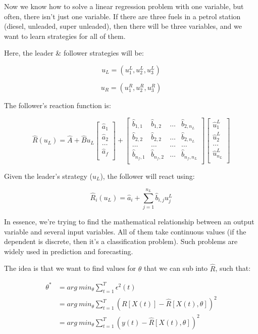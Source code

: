 Now we know how to solve a linear regression problem with one variable, but
often, there isn't just one variable. If there are three fuels in a petrol
station (diesel, unleaded, super unleaded), then there will be three variables,
and we want to learn strategies for all of them.

Here, the leader \& follower strategies will be:

\[
  u_L = (u^L_1, u^L_2, u^L_3)
\]

\[
  u_R = (u^R_1, u^R_2, u^R_3)
\]

The follower's reaction function is:

\[
\hat{R}(u_L) = \hat{A} + \hat{B} u_L
  \begin{bmatrix}
    \hat{a}_1\\
    \hat{a}_2\\
    \dots\\
    \hat{a}_f\\
  \end{bmatrix}
  +
  \begin{bmatrix}
    \hat{b}_{1,1}& \hat{b}_{1,2} & \dots & \hat{b}_{2,n_L}\\
    \hat{b}_{2,2}& \hat{b}_{2,2} & \dots & \hat{b}_{2,n_L}\\
    \dots & \dots & \dots & \dots\\
    \hat{b}_{n_f,1} & \hat{b}_{n_f,2} & \dots & \hat{b}_{n_f,n_L}\\
  \end{bmatrix}
  \begin{bmatrix}
    \hat{u}_1^L\\
    \hat{u}_2^L\\
    \dots\\
    \hat{u}_{n_L}^L\\
  \end{bmatrix}
\]

Given the leader's strategy ($u_L$), the follower will react using:

\[
  \hat{R}_i(u_L) = \hat{a}_i + \sum^{n_L}_{j=1}\hat{b}_{i,j}u^L_{j}
\]

In essence, we're trying to find the mathematical relationship between an output
variable and several input variables. All of them take continuous values (if the
dependent is discrete, then it's a classification problem). Such problems are
widely used in prediction and forecasting.

The idea is that we want to find values for $\theta$ that we can sub into
$\hat{R}$, such that:

\[
  \begin{split}
  \theta^* &= arg~min_\theta \sum^T_{t=1}\epsilon^2(t)\\
           &= arg~min_\theta \sum^T_{t=1}(R[X(t)] - \hat{R}[X(t), \theta])^2\\
           &= arg~min_\theta \sum^T_{t=1}(y(t) - \hat{R}[X(t), \theta])^2
  \end{split}
\]

